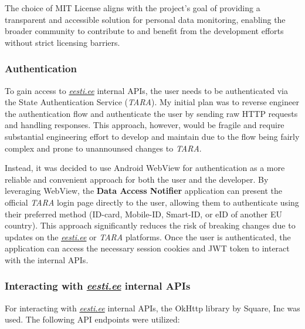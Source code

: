 The choice of MIT License aligns with the project's goal of providing a transparent and accessible solution for personal data monitoring, enabling the broader community to contribute to and benefit from the development efforts without strict licensing barriers.

\subsubsection{Authentication}
To gain access to \textit{\href{https://www.eesti.ee}{eesti.ee}} internal APIs, the user needs to be authenticated via the State Authentication Service (\textit{TARA}). My initial plan was to reverse engineer the authentication flow and authenticate the user by sending raw HTTP requests and handling responses. This approach, however, would be fragile and require substantial engineering effort to develop and maintain due to the flow being fairly complex and prone to unannounsed changes to \textit{TARA}.

Instead, it was decided to use Android WebView for authentication as a more reliable and convenient approach for both the user and the developer. By leveraging WebView, the \textbf{Data Access Notifier} application can present the official \textit{TARA} login page directly to the user, allowing them to authenticate using their preferred method (ID-card, Mobile-ID, Smart-ID, or eID of another EU country). This approach significantly reduces the risk of breaking changes due to updates on the \textit{\href{https://www.eesti.ee}{eesti.ee}} or \textit{TARA} platforms. Once the user is authenticated, the application can access the necessary session cookies and JWT token to interact with the internal APIs.

\subsubsection{Interacting with \textit{\href{https://www.eesti.ee}{eesti.ee}} internal APIs}
For interacting with \textit{\href{https://www.eesti.ee}{eesti.ee}} internal APIs, the OkHttp library by Square, Inc\cite{okhttp-library} was used. The following API endpoints were utilized:

